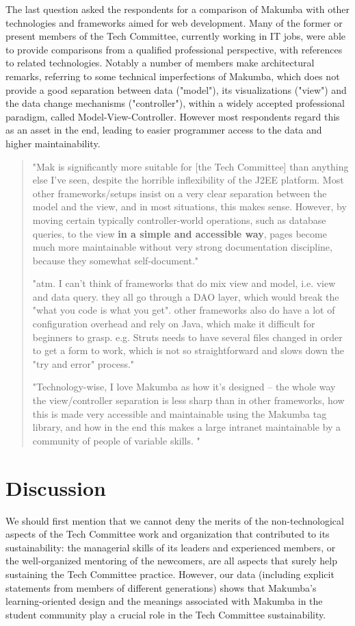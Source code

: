 \documentclass{sig-alt-release2}
\begin{document}
The last question asked the respondents for a comparison of Makumba with other technologies and frameworks aimed for web development. Many of the former or present members of the Tech Committee, currently working in IT jobs, were able to provide comparisons from a qualified professional perspective, with references to related technologies. Notably a number of members make architectural remarks, referring to some technical imperfections of Makumba, which does not provide a good separation between data ("model"), its visualizations ("view") and the data change mechanisms ("controller"), within a widely accepted professional paradigm, called Model-View-Controller. However most respondents regard this as an asset in the end, leading to easier programmer access to the data and higher maintainability.

\begin{quotation}
	"Mak is significantly more suitable for [the Tech Committee] than anything else I've seen, despite the horrible inflexibility of the J2EE platform. Most other frameworks/setups insist on a very clear separation between the model and the view, and in most situations, this makes sense. However, by moving certain typically controller-world operations, such as database queries, to the view \textbf{in a simple and accessible way}, pages become much more maintainable without very strong documentation discipline, because they somewhat self-document."

	"atm. I can't think of frameworks that do mix view and model, i.e. view and data query. they all go through a DAO layer, which would break the "what you code is what you get". other frameworks also do have a lot of configuration overhead and rely on Java, which make it difficult for beginners to grasp. e.g. Struts needs to have several files changed in order to get a form to work, which is not so straightforward and slows down the "try and error" process." 
	
	"Technology-wise, I love Makumba as how it's designed -- the whole way the view/controller separation is less sharp than in other frameworks, how this is made very accessible and maintainable using the Makumba tag library, and how in the end this makes a large intranet maintainable by a community of people of variable skills. "

\end{quotation}

\section{Discussion}\label{sec:disco}
We should first mention that we cannot deny the merits of the non-technological aspects of the Tech Committee work and organization that contributed to its sustainability: the managerial skills of its leaders and experienced members, or the well-organized mentoring of the newcomers, are all aspects that surely help sustaining the Tech Committee practice. However, our data (including explicit statements from members of different generations) shows that Makumba's learning-oriented design and the meanings associated with Makumba in the student community play a crucial role in the Tech Committee sustainability.
\end{document}
